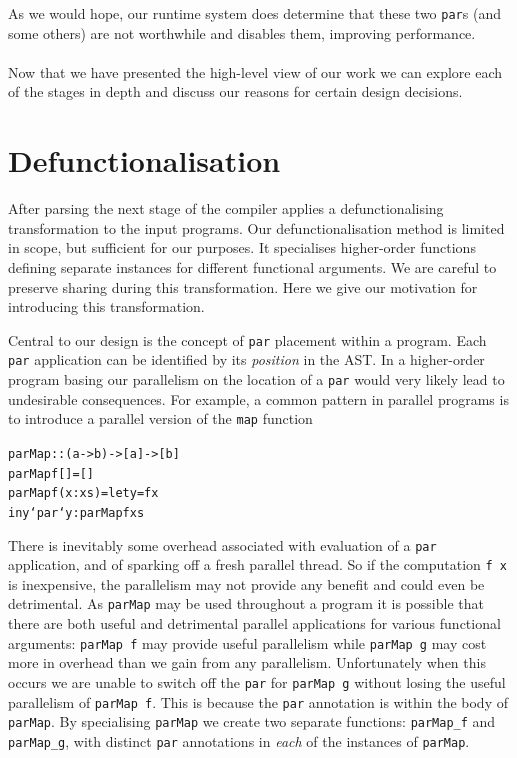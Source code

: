 As we would hope, our runtime system does determine that these two \verb-par-s (and some
others) are not worthwhile and disables them, improving performance.

\paragraph{}

Now that we have presented the high-level view of our work we can explore each of
the stages in depth and discuss our reasons for certain design decisions.


\section{Defunctionalisation}
\label{sec:defunct}

After parsing the next stage of the compiler applies a defunctionalising
transformation to the input programs. Our defunctionalisation method is limited
in scope, but sufficient for our purposes. It specialises higher-order
functions defining separate instances for different functional arguments. We
are careful to preserve sharing during this transformation. Here we give our
motivation for introducing this transformation.

Central to our design is the concept of \verb-par- placement within a program.
Each \verb-par- application can be identified by its \emph{position} in the
AST. In a higher-order program basing our parallelism on the location of a
\verb-par- would very likely lead to undesirable consequences. For example, a common pattern
in parallel programs is to introduce a parallel version of the \verb-map-
function

\begin{alltt}
    parMap :: (a -> b) -> [a] -> [b]
    parMap f []     = []
    parMap f (x:xs) = let y = f x
                      in y `par` y : parMap f xs
\end{alltt}

There is inevitably some overhead associated with evaluation of a \verb-par-
application, and of sparking off a fresh parallel thread.  So if the
computation \verb-f x- is inexpensive, the parallelism may not provide any
benefit and could even be detrimental. As \verb-parMap- may be used throughout
a program it is possible that there are both useful and detrimental parallel
applications for various functional arguments: \verb-parMap f- may provide
useful parallelism while \verb-parMap g- may cost more in overhead than we gain
from any parallelism.  Unfortunately when this occurs we are unable to switch
off the \verb-par- for \verb-parMap g- without losing the useful parallelism of
\verb-parMap f-. This is because the \verb-par- annotation is within the body
of \verb-parMap-. By specialising \verb-parMap- we create two separate
functions: \verb-parMap_f- and \verb-parMap_g-, with distinct \verb-par-
annotations in \emph{each} of the instances of \verb-parMap-.


